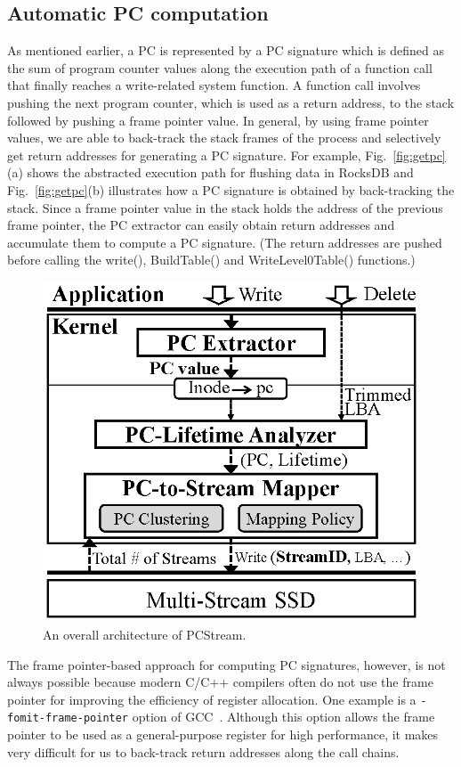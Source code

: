 \subsection{Automatic PC computation}
As mentioned earlier, a PC is represented by a PC signature which is defined as
the sum of program counter values along the execution path of a function call that
finally reaches a write-related system function. A function call involves
pushing the next program counter, which is used as a return address, to the
stack followed by pushing a frame pointer value.  In general, by using frame
pointer values, we are able to back-track the stack frames of the process and
selectively get return addresses for generating a PC signature.  For example,
Fig.~\ref{fig:getpc}(a) shows the abstracted execution path for flushing data
in RocksDB and Fig.~\ref{fig:getpc}(b) illustrates how a PC signature is obtained
by back-tracking the stack.  
Since a frame pointer value in the stack holds the address of the previous
frame pointer, the PC extractor can easily obtain return addresses and
accumulate them to compute a PC signature. 
(The return addresses are pushed
before calling the \textsf{\small  write()}, \textsf{\small  BuildTable()} and \textsf{\small 
WriteLevel0Table()} functions.)

\begin{figure}[t]
	\centering
	\includegraphics[width=0.6\linewidth]{figure/architecture4}
	\caption{An overall architecture of \textsf{\small PCStream}.}
	\label{fig:architecture}
\end{figure}


The frame pointer-based approach for computing PC signatures, however, is not
always possible because modern C/C++ compilers often do not use the frame
pointer for improving the efficiency of register allocation.
One example is a
{\tt -fomit-frame-pointer} option of GCC~\cite{GCC}. 
Although this option allows the frame pointer to be used as a general-purpose
register for high performance, it makes very difficult for us to back-track
return addresses along the call chains.  

